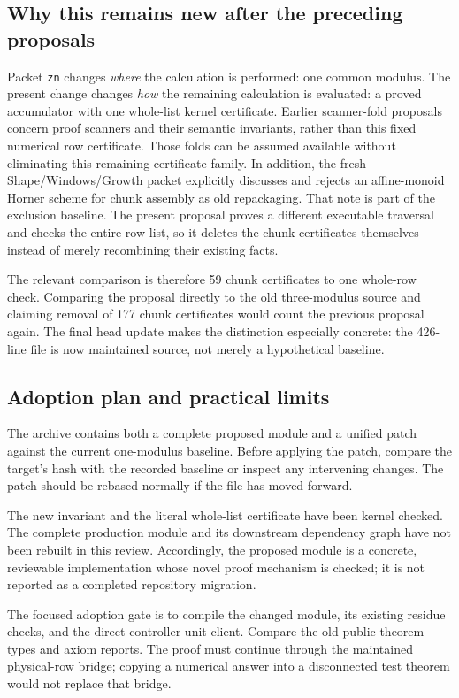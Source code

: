 \documentclass[11pt,a4paper]{article}
\newcommand{\code}[1]{\texttt{#1}}
\begin{document}
\subsection{Why this remains new after the preceding proposals}

Packet \code{zn} changes \emph{where} the calculation is performed: one common modulus. The present change changes \emph{how} the remaining calculation is evaluated: a proved accumulator with one whole-list kernel certificate. Earlier scanner-fold proposals concern proof scanners and their semantic invariants, rather than this fixed numerical row certificate. Those folds can be assumed available without eliminating this remaining certificate family. In addition, the fresh Shape/Windows/Growth packet explicitly discusses and rejects an affine-monoid Horner scheme for chunk assembly as old repackaging. That note is part of the exclusion baseline. The present proposal proves a different executable traversal and checks the entire row list, so it deletes the chunk certificates themselves instead of merely recombining their existing facts.

The relevant comparison is therefore 59 chunk certificates to one whole-row check. Comparing the proposal directly to the old three-modulus source and claiming removal of 177 chunk certificates would count the previous proposal again. The final head update makes the distinction especially concrete: the 426-line file is now maintained source, not merely a hypothetical baseline.

\subsection{Adoption plan and practical limits}

The archive contains both a complete proposed module and a unified patch against the current one-modulus baseline. Before applying the patch, compare the target's hash with the recorded baseline or inspect any intervening changes. The patch should be rebased normally if the file has moved forward.

The new invariant and the literal whole-list certificate have been kernel checked. The complete production module and its downstream dependency graph have not been rebuilt in this review. Accordingly, the proposed module is a concrete, reviewable implementation whose novel proof mechanism is checked; it is not reported as a completed repository migration.

The focused adoption gate is to compile the changed module, its existing residue checks, and the direct controller-unit client. Compare the old public theorem types and axiom reports. The proof must continue through the maintained physical-row bridge; copying a numerical answer into a disconnected test theorem would not replace that bridge.
\end{document}
